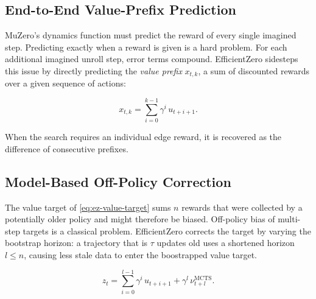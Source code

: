 \subsection{End-to-End Value-Prefix Prediction}\label{sec:ez-value-prefix}

MuZero's dynamics function must predict the reward of every single imagined
step.
Predicting exactly when a reward is given is a hard problem.
For each additional imagined unroll step, error terms compound.
EfficientZero sidesteps this issue by directly predicting the \emph{value prefix} $x_{t,k}$,
a sum of discounted rewards over a given sequence of actions:

\begin{equation}\label{eq:ez-value-prefix}
  x_{t,k}=\sum_{i=0}^{k-1}\gamma^{i}\,u_{t+i+1}.
\end{equation}

When the search requires an individual edge reward, it is recovered as the
difference of consecutive prefixes.

\subsection{Model-Based Off-Policy Correction}\label{sec:ez-off-policy}

The value target of \cref{eq:ez-value-target} sums $n$ rewards that were
collected by a potentially older policy and might therefore be biased.
Off-policy bias of multi-step targets is a classical problem.
EfficientZero corrects the target by varying the bootstrap horizon:
a trajectory that is $\tau$ updates old uses a shortened horizon $l\leq n$,
causing less stale data to enter the boostrapped value target.

\begin{equation}\label{eq:ez-corrected-target}
  z_t=\sum_{i=0}^{l-1}\gamma^{i}\,u_{t+i+1}+\gamma^{l}\,\nu^{\text{MCTS}}_{t+l}.
\end{equation}
